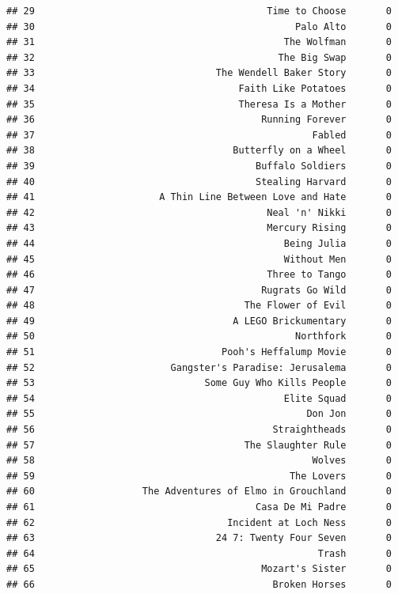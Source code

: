 \documentclass[
]{article}
\begin{document}
\begin{verbatim}
## 29                                         Time to Choose       0
## 30                                              Palo Alto       0
## 31                                            The Wolfman       0
## 32                                           The Big Swap       0
## 33                                The Wendell Baker Story       0
## 34                                    Faith Like Potatoes       0
## 35                                    Theresa Is a Mother       0
## 36                                        Running Forever       0
## 37                                                 Fabled       0
## 38                                   Butterfly on a Wheel       0
## 39                                       Buffalo Soldiers       0
## 40                                       Stealing Harvard       0
## 41                      A Thin Line Between Love and Hate       0
## 42                                         Neal 'n' Nikki       0
## 43                                         Mercury Rising       0
## 44                                            Being Julia       0
## 45                                            Without Men       0
## 46                                         Three to Tango       0
## 47                                        Rugrats Go Wild       0
## 48                                     The Flower of Evil       0
## 49                                   A LEGO Brickumentary       0
## 50                                              Northfork       0
## 51                                 Pooh's Heffalump Movie       0
## 52                        Gangster's Paradise: Jerusalema       0
## 53                              Some Guy Who Kills People       0
## 54                                            Elite Squad       0
## 55                                                Don Jon       0
## 56                                          Straightheads       0
## 57                                     The Slaughter Rule       0
## 58                                                 Wolves       0
## 59                                             The Lovers       0
## 60                   The Adventures of Elmo in Grouchland       0
## 61                                       Casa De Mi Padre       0
## 62                                  Incident at Loch Ness       0
## 63                                24 7: Twenty Four Seven       0
## 64                                                  Trash       0
## 65                                        Mozart's Sister       0
## 66                                          Broken Horses       0

\end{verbatim}
\end{document}
